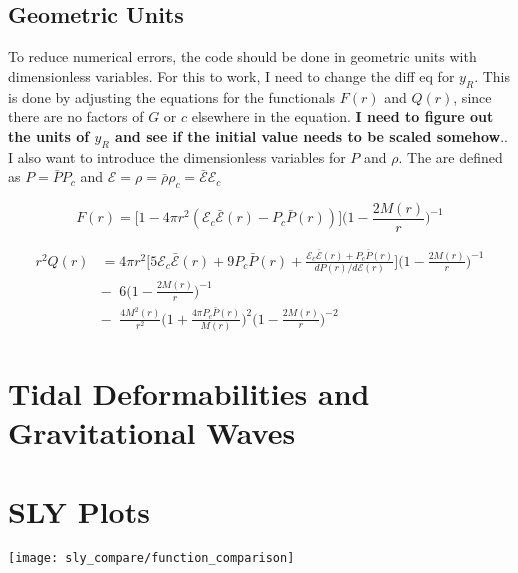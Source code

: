 \documentclass[11pt]{article}
\numberwithin{equation}{section}
\begin{document}
\subsection{Geometric Units} 

To reduce numerical errors, the code should be done in geometric units with dimensionless variables.  For this to work, I need to change the diff eq for $y_R$.  This is done by adjusting the equations  for the functionals $F(r)$ and $Q(r)$, since there are no factors of $G$ or $c$ elsewhere in the equation. \textbf{I need to figure out the units of $y_R$ and see if the initial value needs to be scaled somehow}..  I also want to introduce the dimensionless variables for $P$ and $\rho$.  The are defined as $P = \bar{P} P_c$ and $\mathcal{E} = \rho = \bar{\rho} \rho_{c} = \bar{\mathcal{E}} \mathcal{E}_{c}$

\begin{equation} 
F(r) = \bigg[ 1- 4 \pi r^{2} (\mathcal{E}_{c}\bar{\mathcal{E}}(r)-P_{c}\bar{P}(r))  \bigg] \bigg( 1-\frac{2 M(r) }{r}  \bigg)^{-1}
\end{equation}

\begin{align} 
r^{2} Q(r) &= 4 \pi r^{2} \bigg[ 5 \mathcal{E}_{c}\bar{\mathcal{E}}(r)+ 9 P_{c}\bar{P}(r) + \frac{\mathcal{E}_{c}\bar{\mathcal{E}}(r) + P_{c}\bar{P}(r)}{dP(r)/d\mathcal{E}(r)}   \bigg] \bigg(  1 - \frac{2 M(r)}{r} \bigg) ^{-1} \\
& - \;\; 6 \bigg( 1- \frac{2 M(r) }{r }  \bigg)^{-1} \nonumber \\	
& - \;\; \frac{4 M^{2}(r)}{r^{2}} \bigg( 1 + \frac{4 \pi P_{c} \bar{P}(r)}{M(r)}  \bigg)^{2} \bigg( 1 - \frac{2 M(r)}{r} \bigg)^{-2} \nonumber
\end{align}







\section{Tidal Deformabilities and Gravitational Waves}

\clearpage

\section{SLY Plots}

\texttt{[image: sly\_compare/function\_comparison]} \\



\end{document}
